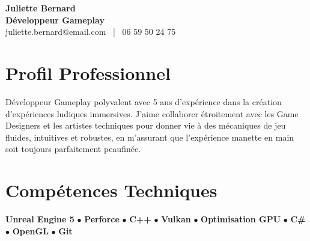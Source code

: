 \documentclass[11pt,a4paper]{article}
\begin{document}
\begin{center}
    {\Huge \textbf{Juliette Bernard}} \\[0.2cm]
    {\Large \textbf{Développeur Gameplay}} \\[0.1cm]
    juliette.bernard@email.com \ | \ 06 59 50 24 75
\end{center}

\vspace{0.3cm}

\section*{Profil Professionnel}
\noindent
Développeur Gameplay polyvalent avec 5 ans d'expérience dans la création d'expériences ludiques immersives. J'aime collaborer étroitement avec les Game Designers et les artistes techniques pour donner vie à des mécaniques de jeu fluides, intuitives et robustes, en m'assurant que l'expérience manette en main soit toujours parfaitement peaufinée.

\vspace{0.3cm}

\section*{Compétences Techniques}
\noindent
\textbf{Unreal Engine 5} $\bullet$ \textbf{Perforce} $\bullet$ \textbf{C++} $\bullet$ \textbf{Vulkan} $\bullet$ \textbf{Optimisation GPU} $\bullet$ \textbf{C\#} $\bullet$ \textbf{OpenGL} $\bullet$ \textbf{Git}

\vspace{0.3cm}

\end{document}

